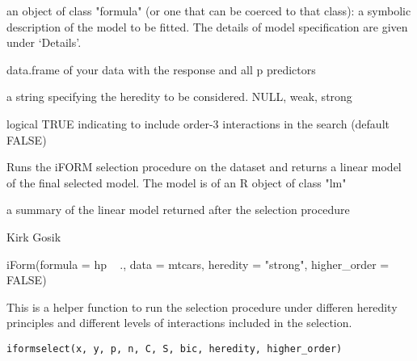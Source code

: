 \documentclass[letterpaper]{book}
\begin{document}
%
\begin{Arguments}
\begin{ldescription}
\item[\code{formula}] an object of class "formula" (or one that can be coerced to that class): a symbolic description of the model to be fitted. The details of model specification are given under ‘Details’.

\item[\code{data}] data.frame of your data with the response and all p predictors

\item[\code{heredity}] a string specifying the heredity to be considered. NULL, weak, strong

\item[\code{higher\_order}] logical TRUE indicating to include order-3 interactions in the search (default FALSE)
\end{ldescription}
\end{Arguments}
%
\begin{Details}\relax
Runs the iFORM selection procedure on the dataset and returns a linear model
of the final selected model.  The model is of an R object of class "lm"
\end{Details}
%
\begin{Value}
a summary of the linear model returned after the selection procedure
\end{Value}
%
\begin{Author}\relax
Kirk Gosik
\end{Author}
%
\begin{SeeAlso}\relax
{}

\end{SeeAlso}
%
\begin{Examples}
\begin{ExampleCode}
iForm(formula = hp ~ ., data = mtcars, heredity = "strong", higher_order = FALSE)
\end{ExampleCode}
\end{Examples}
%
\begin{Description}\relax
This is a helper function to run the selection procedure under differen heredity principles
and different levels of interactions included in the selection.
\end{Description}
%
\begin{Usage}
\begin{verbatim}
iformselect(x, y, p, n, C, S, bic, heredity, higher_order)
\end{verbatim}
\end{Usage}
\end{document}
